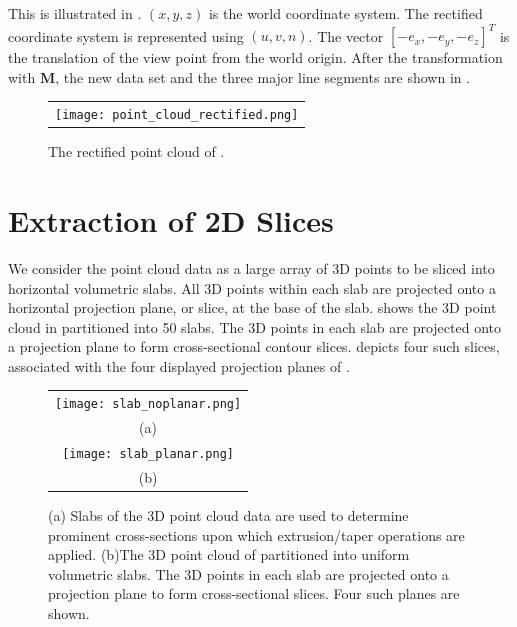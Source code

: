 This is illustrated in . $(x, y, z)$ is the world coordinate system.
The rectified coordinate system is represented using $(u, v, n)$. 
The vector $[-e_x, -e_y, -e_z]^T$ is the translation of the view point from the world origin.
After the transformation with $\mathbf{M}$, the new data set and the three major line segments are
shown in .

\begin{figure}[htbp]
\begin{center}
\begin{tabular}{c}
\texttt{[image: point\_cloud\_rectified.png]}
\end{tabular}
\end{center}
\caption{ The rectified point cloud of . }
\label{fig:pc_rect}
\end{figure}


\section{Extraction of 2D Slices}
\label{sec:image_slicing}

We consider the point cloud data as a large array of 3D points to be
sliced into horizontal volumetric slabs.
All 3D points within each slab are projected onto a horizontal projection
plane, or slice, at the base of the slab.
 shows the 3D point cloud in  partitioned into
50 slabs.
The 3D points in each slab are projected onto a projection plane to
form cross-sectional contour slices.
 depicts four such slices, associated with the four displayed
projection planes of .

\begin{figure} [htbp]
\begin{center}
\begin{tabular}{c}
\texttt{[image: slab\_noplanar.png]} \\
(a) \\
\texttt{[image: slab\_planar.png]} \\
(b)
\end{tabular}
\end{center}
\caption{
(a) Slabs of the 3D point cloud data are used to determine prominent
cross-sections upon which extrusion/taper operations are applied.
(b)The 3D point cloud of  partitioned into uniform
volumetric slabs.
The 3D points in each slab are projected onto a projection plane to
form cross-sectional slices. Four such planes are shown.}
\label{fig:slice_slab}
\end{figure}

